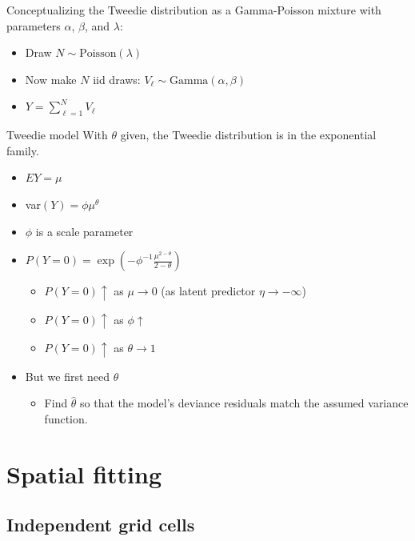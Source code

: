 \documentclass{beamer}
\begin{document}
\begin{frame}
  Conceptualizing the Tweedie distribution as a Gamma-Poisson mixture with parameters $\alpha$, $\beta$, and $\lambda$:\\
  \begin{itemize}
    \item Draw $N \sim \text{Poisson}(\lambda)$
    \item Now make $N$ iid draws: $V_{\ell} \sim \text{Gamma}(\alpha, \beta)$
    \item $Y = \sum\limits_{\ell=1}^N  V_{\ell}$
  \end{itemize}
\end{frame}


\begin{frame}[fragile]{Tweedie model}
  With $\theta$ given, the Tweedie distribution is in the exponential family.\\
  \begin{itemize}
    \item $EY = \mu$
    \item var$(Y) = \phi \mu^\theta$
    \item $\phi$ is a scale parameter
    \item $P(Y=0) = \exp{\left(-\phi^{-1} \frac{\mu^{2-\theta}}{2-\theta}\right)}$
    \begin{itemize}
      \item $P(Y=0) \uparrow$ as $\mu \rightarrow 0$ (as latent predictor $\eta \rightarrow -\infty$)
      \item $P(Y=0) \uparrow$ as $\phi \uparrow$
      \item $P(Y=0) \uparrow$ as $\theta \rightarrow 1$
    \end{itemize}
    \item But we first need $\theta$
    \begin{itemize}
      \item Find $\hat{\theta}$ so that the model's deviance residuals match the assumed variance function. 
    \end{itemize}
  \end{itemize}
\end{frame}


\section{Spatial fitting}

\subsection{Independent grid cells}
\end{document}
